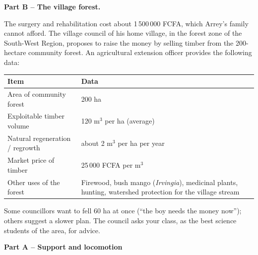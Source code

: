 \documentclass[11pt]{article}
\newcounter{popsec}
\newcounter{popsub}
\newcommand{\courssub}[1]{%
  \stepcounter{popsub}%
  \par\vspace{9pt}\noindent{\popxbold\fontsize{11.5}{13}\selectfont\color{popink}{\color{poporange}\thepopsec.\thepopsub}\hspace{6pt}#1}\par\nopagebreak\vspace{4pt}
}
\begin{document}
\textbf{Part B -- The village forest.}

The surgery and rehabilitation cost about 1\,500\,000 FCFA, which Arrey's family cannot afford. The village council of his home village, in the forest zone of the South-West Region, proposes to raise the money by selling timber from the 200-hectare community forest. An agricultural extension officer provides the following data:

\begin{center}
\begin{tabularx}{\linewidth}{|l|X|}
\hline
\rowcolor{popblueL} \textbf{Item} & \textbf{Data} \\
\hline
Area of community forest & 200 ha \\
\hline
Exploitable timber volume & 120 m$^3$ per ha (average) \\
\hline
Natural regeneration / regrowth & about 2 m$^3$ per ha per year \\
\hline
Market price of timber & 25\,000 FCFA per m$^3$ \\
\hline
Other uses of the forest & Firewood, bush mango (\emph{Irvingia}), medicinal plants, hunting, watershed protection for the village stream \\
\hline
\end{tabularx}
\end{center}

Some councillors want to fell 60 ha at once (``the boy needs the money now''); others suggest a slower plan. The council asks your class, as the best science students of the area, for advice.

\courssub{Tasks}

\textbf{Part A -- Support and locomotion}
\end{document}

